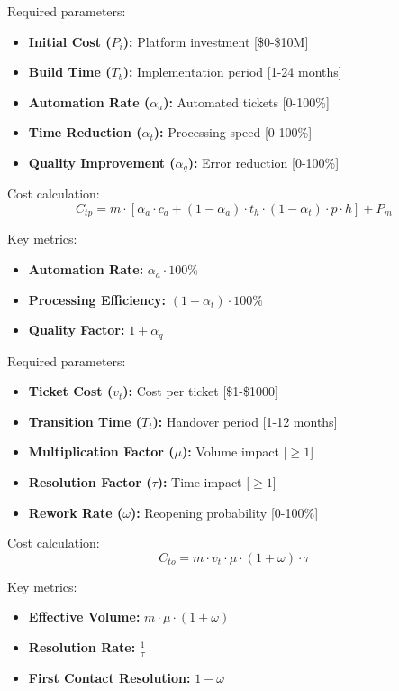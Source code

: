\documentclass[12pt,a4paper]{article}
\newenvironment{definition}[1]
{\begin{mdframed}[style=definitionstyle,frametitle={Definition: #1}]}
{\end{mdframed}}
\begin{document}
\begin{definition}{Ticket Platform Solution Inputs}
Required parameters:
\begin{itemize}
    \item \textbf{Initial Cost ($P_i$):} Platform investment [\$0-\$10M]
    \item \textbf{Build Time ($T_b$):} Implementation period [1-24 months]
    \item \textbf{Automation Rate ($\alpha_a$):} Automated tickets [0-100\%]
    \item \textbf{Time Reduction ($\alpha_t$):} Processing speed [0-100\%]
    \item \textbf{Quality Improvement ($\alpha_q$):} Error reduction [0-100\%]
\end{itemize}

Cost calculation:
\begin{equation}
    C_{tp} = m \cdot [\alpha_a \cdot c_a + (1-\alpha_a) \cdot t_h \cdot (1-\alpha_t) \cdot p \cdot h] + P_m
\end{equation}

Key metrics:
\begin{itemize}
    \item \textbf{Automation Rate:} $\alpha_a \cdot 100\%$
    \item \textbf{Processing Efficiency:} $(1 - \alpha_t) \cdot 100\%$
    \item \textbf{Quality Factor:} $1 + \alpha_q$
\end{itemize}
\end{definition}

\begin{definition}{Ticket Outsourcing Solution Inputs}
Required parameters:
\begin{itemize}
    \item \textbf{Ticket Cost ($v_t$):} Cost per ticket [\$1-\$1000]
    \item \textbf{Transition Time ($T_t$):} Handover period [1-12 months]
    \item \textbf{Multiplication Factor ($\mu$):} Volume impact [$\geq 1$]
    \item \textbf{Resolution Factor ($\tau$):} Time impact [$\geq 1$]
    \item \textbf{Rework Rate ($\omega$):} Reopening probability [0-100\%]
\end{itemize}

Cost calculation:
\begin{equation}
    C_{to} = m \cdot v_t \cdot \mu \cdot (1 + \omega) \cdot \tau
\end{equation}

Key metrics:
\begin{itemize}
    \item \textbf{Effective Volume:} $m \cdot \mu \cdot (1 + \omega)$
    \item \textbf{Resolution Rate:} $\frac{1}{\tau}$
    \item \textbf{First Contact Resolution:} $1 - \omega$
\end{itemize}
\end{definition}
\end{document}
